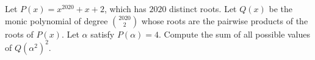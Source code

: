 Let $P(x)=x^{2020}+x+2$, which has $2020$ distinct roots. Let $Q(x)$ be the monic polynomial of degree $\binom{2020}{2}$ whose roots are the pairwise products of the roots of $P(x)$. Let $\alpha$ satisfy $P(\alpha)=4$. Compute the sum of all possible values of $Q(\alpha^2)^2$.

